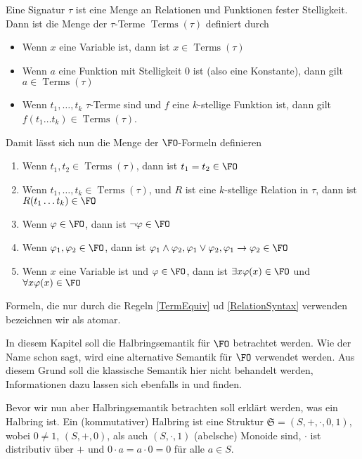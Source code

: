 \begin{definition}
	Eine Signatur $\tau$ ist eine Menge an Relationen und Funktionen fester Stelligkeit.
	Dann ist die Menge der $\tau$-Terme $\operatorname{Terms}(\tau)$ definiert durch
	\begin{itemize}
		\item Wenn $x$ eine Variable ist, dann ist $x\in\operatorname{Terms}(\tau)$
		\item Wenn $a$ eine Funktion mit Stelligkeit $0$ ist (also eine Konstante), dann gilt $a\in \operatorname{Terms}(\tau)$
		\item Wenn $t_1,\dots,t_k$ $\tau$-Terme sind und $f$ eine $k$-stellige Funktion ist, dann gilt $f(t_1\dots t_k)\in \operatorname{Terms}(\tau)$.
	\end{itemize}
	Damit lässt sich nun die Menge der $\FO$-Formeln definieren
	\begin{enumerate}
		\item Wenn $t_1,t_2\in \operatorname{Terms}(\tau)$, dann ist $t_1=t_2\in\FO$ \label{TermEquiv}
		\item Wenn $t_1,\dots,t_k\in \operatorname{Terms}(\tau)$, und $R$ ist eine $k$-stellige Relation in $\tau$, dann ist $R(t_1\dots t_k) \in \FO$ \label{RelationSyntax}
		\item Wenn $\varphi\in \FO$, dann ist $\neg\varphi\in \FO$
		\item Wenn $\varphi_1,\varphi_2\in \FO$, dann ist $\varphi_1\land\varphi_2,\varphi_1\lor\varphi_2,\varphi_1\rightarrow\varphi_2\in \FO$
		\item Wenn $x$ eine Variable ist und $\varphi\in \FO$, dann ist $\exists x \varphi(x)\in \FO$ und $\forall x \varphi(x)\in \FO$
	\end{enumerate}
	
	Formeln, die nur durch die Regeln \ref{TermEquiv} ud \ref{RelationSyntax} verwenden bezeichnen wir als atomar.
\end{definition}

In diesem Kapitel soll die Halbringsemantik für $\FO$ betrachtet werden. 
Wie der Name schon sagt, wird eine alternative Semantik für $\FO$ verwendet werden.
Aus diesem Grund soll die klassische Semantik hier nicht behandelt werden, Informationen dazu lassen sich ebenfalls in \cite{barwise1977introduction} und \cite{ebbinghaus1994mathematical} finden.

Bevor wir nun aber Halbringsemantik betrachten soll erklärt werden, was ein Halbring ist. 
Ein (kommutativer) Halbring ist eine Struktur $\mathfrak{S}=(S,+,\cdot,0,1)$, wobei $0\neq 1$, $(S,+,0)$, als auch $(S,\cdot,1)$ (abelsche) Monoide sind, $\cdot$ ist distributiv über $+$ und $0\cdot a = a \cdot 0 = 0$ für alle $a\in S$. \cite{dannert2019provenance}

